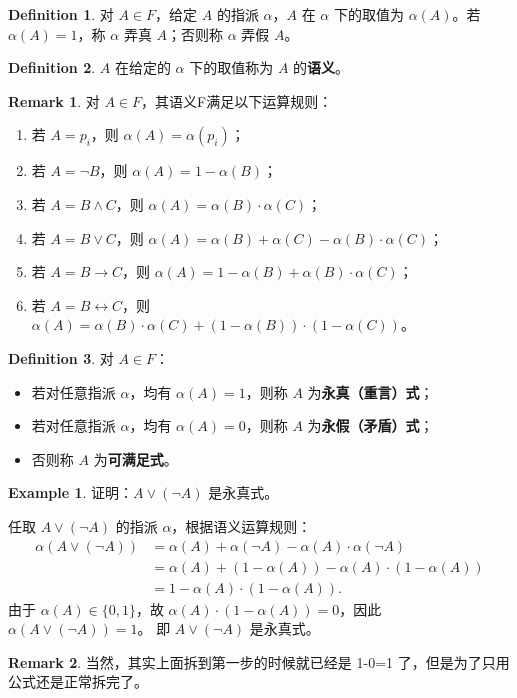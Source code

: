 \documentclass[oneside]{book}
\theoremstyle{definition}
\newtheorem{example}{Example}[section]
\newtheorem{definition}{Definition}[section]
\newtheorem{remark}{Remark}[section]
\begin{document}
\begin{definition}
	对 \( A \in F \)，给定 \( A \) 的指派 \( \alpha \)，\( A \) 在 \( \alpha \) 下的取值为 \( \alpha(A) \)。若 \( \alpha(A) = 1 \)，称 \( \alpha \) 弄真 \( A \)；否则称 \( \alpha \) 弄假 \( A \)。
\end{definition}


\begin{definition}
	\( A \) 在给定的 \( \alpha \) 下的取值称为 \( A \) 的\textbf{语义}。
\end{definition}


\begin{remark}
	对 \( A \in F \)，其语义F满足以下运算规则：
	\begin{enumerate}
		\item 若 \( A = p_i \)，则 \( \alpha(A) = \alpha(p_i) \)；
		\item 若 \( A = \neg B \)，则 \( \alpha(A) = 1 - \alpha(B) \)；
		\item 若 \( A = B \land C \)，则 \( \alpha(A) = \alpha(B) \cdot \alpha(C) \)；
		\item 若 \( A = B \lor C \)，则 \( \alpha(A) = \alpha(B) + \alpha(C) - \alpha(B) \cdot \alpha(C) \)；
		\item 若 \( A = B \to C \)，则 \( \alpha(A) = 1 - \alpha(B) + \alpha(B) \cdot \alpha(C) \)；
		\item 若 \( A = B \leftrightarrow C \)，则 \( \alpha(A) = \alpha(B) \cdot \alpha(C) + (1 - \alpha(B)) \cdot (1 - \alpha(C)) \)。
	\end{enumerate}
\end{remark}


\begin{definition}
	对 \( A \in F \)：
	\begin{itemize}
		\item 若对任意指派 \( \alpha \)，均有 \( \alpha(A) = 1 \)，则称 \( A \) 为\textbf{永真（重言）式}；
		\item 若对任意指派 \( \alpha \)，均有 \( \alpha(A) = 0 \)，则称 \( A \) 为\textbf{永假（矛盾）式}；
		\item 否则称 \( A \) 为\textbf{可满足式}。
	\end{itemize}
\end{definition}


\begin{example}
	证明：\( A \lor (\neg A) \) 是永真式。
	
	任取 \( A \lor (\neg A) \) 的指派 \( \alpha \)，根据语义运算规则：
	\[
	\begin{aligned}
		\alpha(A \lor (\neg A)) &= \alpha(A) + \alpha(\neg A) - \alpha(A) \cdot \alpha(\neg A) \\
		&= \alpha(A) + (1 - \alpha(A)) - \alpha(A) \cdot (1 - \alpha(A)) \\
		&= 1 - \alpha(A) \cdot (1 - \alpha(A)).
	\end{aligned}
	\]
	由于 \( \alpha(A) \in \{ 0,1 \} \)，故 \( \alpha(A) \cdot (1 - \alpha(A)) = 0 \)，因此 \( \alpha(A \lor (\neg A)) = 1 \)。
	即 \( A \lor (\neg A) \) 是永真式。
\end{example}
\begin{remark}
	当然，其实上面拆到第一步的时候就已经是 1-0=1 了，但是为了只用公式还是正常拆完了。
\end{remark}
\end{document}
